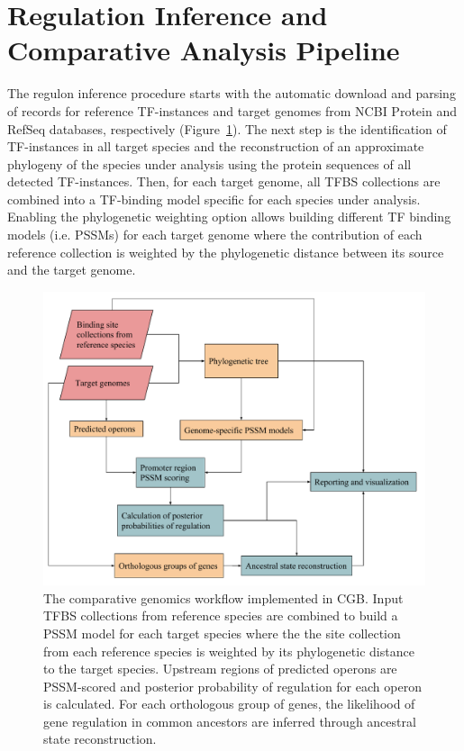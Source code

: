 \section{Regulation Inference and Comparative Analysis Pipeline}

The regulon inference procedure starts with the automatic download and parsing
of records for reference TF-instances and target genomes from NCBI Protein and
RefSeq databases, respectively (Figure~\ref{fig:pipeline}). The next step is
the identification of TF-instances in all target species and the reconstruction
of an approximate phylogeny of the species under analysis using the protein
sequences of all detected TF-instances. Then, for each target genome, all TFBS
collections are combined into a TF-binding model specific for each species
under analysis. Enabling the phylogenetic weighting option allows building
different TF binding models (i.e. PSSMs) for each target genome where the
contribution of each reference collection is weighted by the phylogenetic
distance between its source and the target genome.

\begin{figure}
  \centering
  \includegraphics[width=\textwidth]{figures/chapter4/cgb_workflow}
  \caption[The comparative genomics workflow implemented in CGB.]{The
    comparative genomics workflow implemented in CGB\@. Input TFBS collections
    from reference species are combined to build a PSSM model for each target
    species where the the site collection from each reference species is
    weighted by its phylogenetic distance to the target species. Upstream
    regions of predicted operons are PSSM-scored and posterior probability of
    regulation for each operon is calculated. For each orthologous group of
    genes, the likelihood of gene regulation in common ancestors are inferred
    through ancestral state reconstruction.}
  \label{fig:pipeline}
\end{figure}

